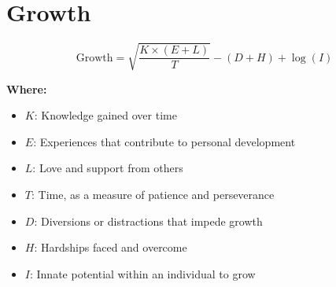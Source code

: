 \chapter{Growth}

\begin{equation}
\text{Growth} = \sqrt{\frac{K \times (E + L)}{T}} - (D + H) + \log(I)
\end{equation}

\textbf{Where:}

\begin{itemize}
    \item $K$: Knowledge gained over time
    \item $E$: Experiences that contribute to personal development
    \item $L$: Love and support from others
    \item $T$: Time, as a measure of patience and perseverance
    \item $D$: Diversions or distractions that impede growth
    \item $H$: Hardships faced and overcome
    \item $I$: Innate potential within an individual to grow
\end{itemize}